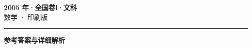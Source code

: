 \documentclass[zihao=5, a4paper]{ctexart}
\begin{document}
\begin{center}
  {\Large\bfseries 2005 年·全国卷Ⅰ·文科}\\[4pt]
  {\large 数学 · 印刷版}
\end{center}
\medskip
{}

\par\bigskip\hrule\bigskip
{}
\begin{center}{\large\bfseries 参考答案与详细解析}\end{center}
\smallskip

\end{document}
